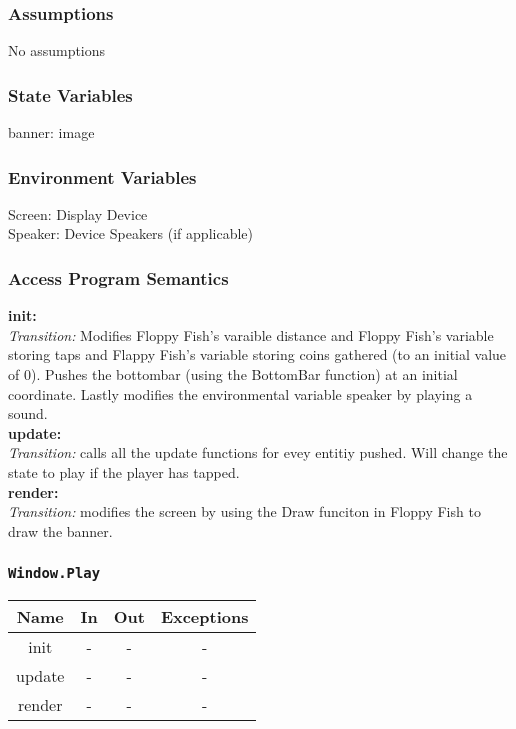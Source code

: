 \documentclass[11pt, oneside]{article}   	%
\begin{document}
\subsubsection{Assumptions}
No assumptions

\subsubsection{State Variables}
banner: image\\



\subsubsection{Environment Variables}
Screen: Display Device\\
Speaker: Device Speakers (if applicable)\\

\subsubsection{Access Program Semantics} 
 \textbf{init:}  \\
 \textit{Transition:} Modifies Floppy Fish's varaible distance and Floppy Fish's variable storing taps and Flappy Fish's variable storing coins gathered (to an initial value of 0). Pushes the bottombar (using the BottomBar function) at an initial coordinate. Lastly modifies the environmental variable speaker by playing a sound.\\
 \textbf{update:}  \\
 \textit{Transition:} calls all the update functions for evey entitiy pushed. Will change the state to play if the player has tapped.\\
 \textbf{render:}  \\
 \textit{Transition:} modifies the screen by using the Draw funciton in Floppy Fish to draw the banner.\\


\subsubsection{\texttt{Window.Play}}



\begin{center}
\begin{tabular}{ |c|c|c|c| } 
 \hline
 Name & In & Out & Exceptions \\ 
 \hline \hline
 init & - & - & - \\ 
 update & - & - & - \\ 
 render & - & - & - \\ 

 \hline
\end{tabular}
\end{center}
\end{document}
